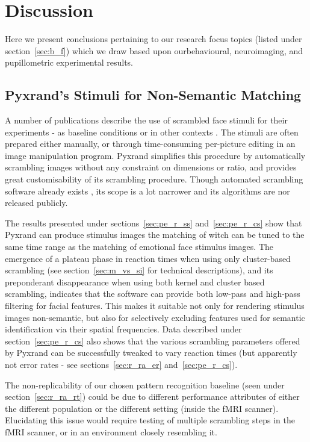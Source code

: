 \chapter{Discussion}
    Here we present conclusions pertaining to our research focus topics (listed under section~\ref{sec:b_f}) which we draw based upon ourbehavioural, neuroimaging, and pupillometric experimental results. 
    \section{Pyxrand's Stimuli for Non-Semantic Matching}
	A number of publications describe the use of scrambled face stimuli for their experiments - as baseline conditions or in other contexts \citep{Lewis2005,Rakover2013}.
	The stimuli are often prepared either manually, or through time-consuming per-picture editing in an image manipulation program.
	Pyxrand \citep{pyxrand} simplifies this procedure by automatically scrambling images without any constraint on dimensions or ratio, and provides great customisability of its scrambling procedure. 
	Though automated scrambling software already exists \citep{Conway2008}, its scope is a lot narrower and its algorithms are nor released publicly.

	The results presented under sections~\ref{sec:pe_r_ss} and~\ref{sec:pe_r_cs} show that Pyxrand can produce stimulus images the matching of witch can be tuned to the same time range as the matching of emotional face stimulus images.
	The emergence of a plateau phase in reaction times when using only cluster-based scrambling (see section~\ref{sec:m_vs_si} for technical descriptions), and its preponderant disappearance when using both kernel and cluster based scrambling, indicates that the software can provide both low-pass and high-pass filtering for facial features.
	This makes it suitable not only for rendering stimulus images non-semantic, but also for selectively excluding features used for semantic identification via their spatial frequencies.
	Data described under section~\ref{sec:pe_r_cs} also shows that the various scrambling parameters offered by Pyxrand can be successfully tweaked to vary reaction times (but apparently not error rates - see sections~\ref{sec:r_ra_er} and~\ref{sec:pe_r_cs}).
	
	The non-replicability of our chosen pattern recognition baseline (seen under section~\ref{sec:r_ra_rt}) could be due to different performance attributes of either the different population or the different setting (inside the fMRI scanner).
	Elucidating this issue would require testing of multiple scrambling steps in the fMRI scanner, or in an environment closely resembling it. 
	
